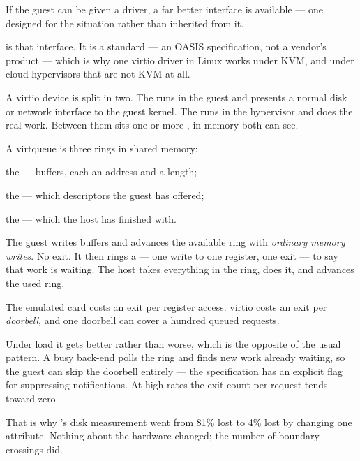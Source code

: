 If the guest can be given a driver, a far better interface is available ---
one designed for the situation rather than inherited from it.

 is that interface. It is a standard --- an OASIS specification,
not a vendor's product --- which is why one virtio driver in Linux works under
KVM, and under cloud hypervisors that are not KVM at all.

\begin{definitionbox}
A virtio device is split in two. The  runs in the guest
and presents a normal disk or network interface to the guest kernel. The
 runs in the hypervisor and does the real work. Between
them sits one or more , in memory both can see.

\smallskip
A virtqueue is three rings in shared memory:
\begin{tight}
  \item the  --- buffers, each an address and a length;
  \item the  --- which descriptors the guest has offered;
  \item the  --- which the host has finished with.
\end{tight}

\smallskip
The guest writes buffers and advances the available ring with \emph{ordinary
memory writes}. No exit. It then rings a  --- one write to one
register, one exit --- to say that work is waiting. The host takes everything
in the ring, does it, and advances the used ring.
\end{definitionbox}

\begin{conceptbox}
The emulated card costs an exit per register access. virtio costs an exit per
\emph{doorbell}, and one doorbell can cover a hundred queued requests.

\smallskip
Under load it gets better rather than worse, which is the opposite of the
usual pattern. A busy back-end polls the ring and finds new work already
waiting, so the guest can skip the doorbell entirely --- the specification has
an explicit flag for suppressing notifications. At high rates the exit count
per request tends toward zero.

\smallskip
That is why 's disk measurement went from 81\% lost to
4\% lost by changing one attribute. Nothing about the hardware changed; the
number of boundary crossings did.
\end{conceptbox}

